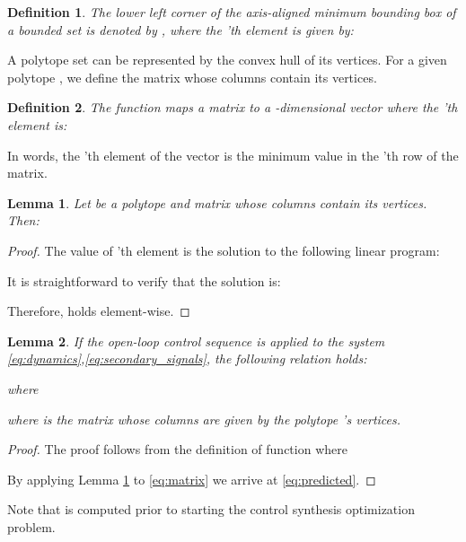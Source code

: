 \documentclass[letterpaper, 10 pt, conference]{ieeeconf}
\newtheorem{define}{Definition}
\newtheorem{lemma}{Lemma}
\begin{document}
\begin{define}
The lower left corner of the axis-aligned minimum bounding box of a bounded set  is denoted by , where the 'th element is given by:

\end{define}

A polytope set  can be represented by the convex hull of its vertices. For a given polytope , we define the matrix  whose columns contain its vertices. 
\begin{define}
The function  maps a  matrix to a -dimensional vector where the 'th element is:

 \end{define}
 
In words, the 'th element of the vector is the minimum value in the 'th row of the matrix. 
\begin{lemma}
\label{lemma:omega}
Let  be a polytope and matrix  whose columns contain its vertices. Then:

\end{lemma}
\begin{proof}
The value of 'th element is the solution to the following linear program: 

It is straightforward to verify that the solution is:

Therefore,  holds element-wise. 
\end{proof}






\begin{lemma}
\label{lemma_secondary}
If the open-loop control sequence  is applied to the system \eqref{eq:dynamics},\eqref{eq:secondary_signals}, the following relation holds:

where

where  is the matrix whose columns are given by the polytope 's vertices. 
\end{lemma}
\begin{proof}
The proof follows from the definition of  function where

By applying Lemma \ref{lemma:omega} to \eqref{eq:matrix} we arrive at \eqref{eq:predicted}.
\end{proof}


Note that  is computed prior to starting the control synthesis optimization problem. 
\end{document}
